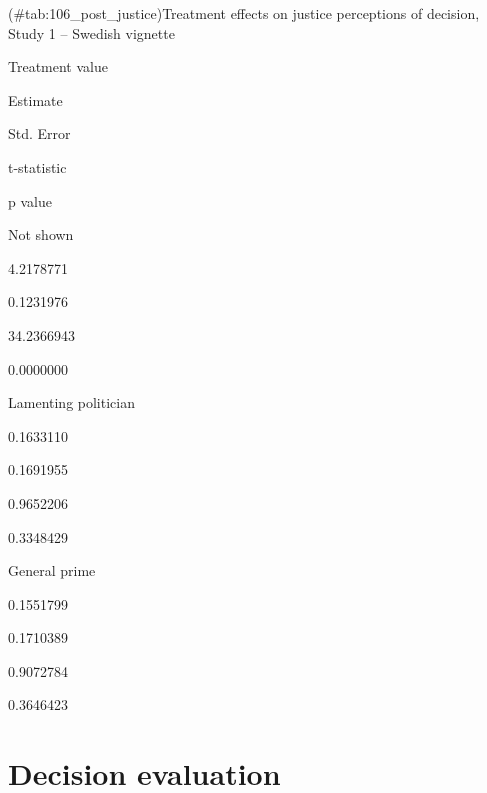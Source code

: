 \documentclass[]{book}
\begin{document}
(\#tab:106\_post\_justice)Treatment effects on justice perceptions of
decision, Study 1 -- Swedish vignette

Treatment value

Estimate

Std. Error

t-statistic

p value

Not shown

4.2178771

0.1231976

34.2366943

0.0000000

Lamenting politician

0.1633110

0.1691955

0.9652206

0.3348429

General prime

0.1551799

0.1710389

0.9072784

0.3646423

\section{Decision evaluation}\label{decision-evaluation-2}
\end{document}
